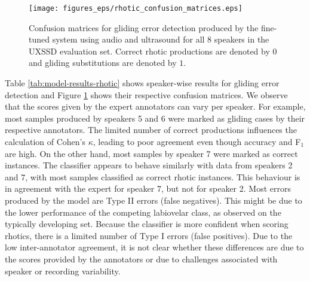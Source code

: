 \begin{figure}[t]
\centering
\texttt{[image: figures\_eps/rhotic\_confusion\_matrices.eps]}
\caption{\label{fig:rhotic_confusion_matrices}
Confusion matrices for gliding error detection produced by the fine-tuned system using audio and ultrasound for all 8 speakers in the UXSSD evaluation set. Correct rhotic productions are denoted by $0$ and gliding substitutions are denoted by $1$. }
\end{figure}


Table \ref{tab:model-results-rhotic} shows speaker-wise results for gliding error detection and Figure \ref{fig:rhotic_confusion_matrices} shows their respective confusion matrices.
We observe that the scores given by the expert annotators can vary per speaker.
For example, most samples produced by speakers 5 and 6 were marked as gliding cases by their respective annotators.
The limited number of correct productions influences the calculation of Cohen's $\kappa$, leading to poor agreement even though accuracy and F$_1$ are high.
On the other hand, most samples by speaker 7 were marked as correct instances.
The classifier appears to behave similarly with data from speakers 2 and 7, with most samples classified as correct rhotic instances.
This behaviour is in agreement with the expert for speaker 7, but not for speaker 2.
Most errors produced by the model are Type II errors (false negatives).
This might be due to the lower performance of the competing labiovelar class, as observed on the typically developing set.
Because the classifier is more confident when scoring rhotics, there is a limited number of Type I errors (false positives).
Due to the low inter-annotator agreement, it is not clear whether these differences are due to the scores provided by the annotators or due to challenges associated with speaker or recording variability.
